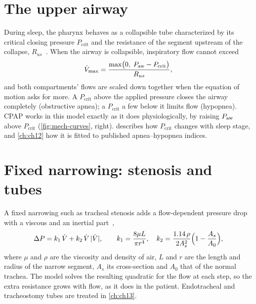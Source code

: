 \section{The upper airway}
\label{sec:mech-ua}
During sleep, the pharynx behaves as a collapsible tube characterized by its critical closing pressure $P_{\mathrm{crit}}$ and the resistance of the segment upstream of the collapse, $R_{us}$~\citep{gold1996}. When the airway is collapsible, inspiratory flow cannot exceed
\begin{equation}
\dot V_{\max} = \frac{\max\bigl(0,\;P_{\mathrm{aw}} - P_{\mathrm{crit}}\bigr)}{R_{us}},
\label{eq:mech-ua}
\end{equation}
and both compartments' flows are scaled down together when the equation of motion asks for more. A $P_{\mathrm{crit}}$ above the applied pressure closes the airway completely (obstructive apnea); a $P_{\mathrm{crit}}$ a few \si{\cmH} below it limits flow (hypopnea). CPAP works in this model exactly as it does physiologically, by raising $P_{\mathrm{aw}}$ above $P_{\mathrm{crit}}$ (\cref{fig:mech-curves}, right).  describes how $P_{\mathrm{crit}}$ changes with sleep stage, and \cref{ch:ch12} how it is fitted to published apnea--hypopnea indices.

\section{Fixed narrowing: stenosis and tubes}
\label{sec:mech-stenosis}
A fixed narrowing such as tracheal stenosis adds a flow-dependent pressure drop with a viscous and an inertial part~\citep{rohrer1915,young1973},
\begin{equation}
\Delta P = k_1\,\dot V + k_2\,\dot V\,|\dot V|,
\qquad
k_1 = \frac{8\mu L}{\pi r^4},\quad
k_2 = \frac{1.14\,\rho}{2A_s^2}\Bigl(1 - \frac{A_s}{A_0}\Bigr),
\label{eq:mech-rohrer}
\end{equation}
where $\mu$ and $\rho$ are the viscosity and density of air, $L$ and $r$ are the length and radius of the narrow segment, $A_s$ its cross-section and $A_0$ that of the normal trachea. The model solves the resulting quadratic for the flow at each step, so the extra resistance grows with flow, as it does in the patient. Endotracheal and tracheostomy tubes are treated in \cref{ch:ch13}.

